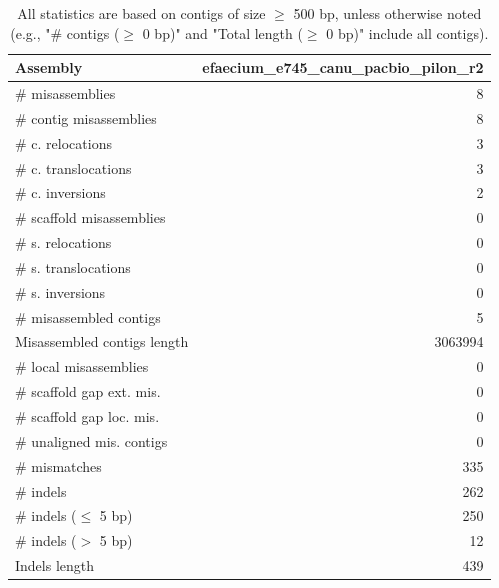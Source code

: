 \documentclass[12pt,a4paper]{article}
\begin{document}
\begin{table}[ht]
\begin{center}
\caption{All statistics are based on contigs of size $\geq$ 500 bp, unless otherwise noted (e.g., "\# contigs ($\geq$ 0 bp)" and "Total length ($\geq$ 0 bp)" include all contigs).}
\begin{tabular}{|l*{1}{|r}|}
\hline
Assembly & efaecium\_e745\_canu\_pacbio\_pilon\_r2 \\ \hline
\# misassemblies & 8 \\ \hline
\hspace{2mm}\# contig misassemblies & 8 \\ \hline
\hspace{5mm}\# c. relocations & 3 \\ \hline
\hspace{5mm}\# c. translocations & 3 \\ \hline
\hspace{5mm}\# c. inversions & 2 \\ \hline
\hspace{2mm}\# scaffold misassemblies & 0 \\ \hline
\hspace{5mm}\# s. relocations & 0 \\ \hline
\hspace{5mm}\# s. translocations & 0 \\ \hline
\hspace{5mm}\# s. inversions & 0 \\ \hline
\# misassembled contigs & 5 \\ \hline
Misassembled contigs length & 3063994 \\ \hline
\# local misassemblies & 0 \\ \hline
\# scaffold gap ext. mis. & 0 \\ \hline
\# scaffold gap loc. mis. & 0 \\ \hline
\# unaligned mis. contigs & 0 \\ \hline
\# mismatches & 335 \\ \hline
\# indels & 262 \\ \hline
\hspace{5mm}\# indels ($\leq$ 5 bp) & 250 \\ \hline
\hspace{5mm}\# indels ($>$ 5 bp) & 12 \\ \hline
Indels length & 439 \\ \hline
\end{tabular}
\end{center}
\end{table}
\end{document}
